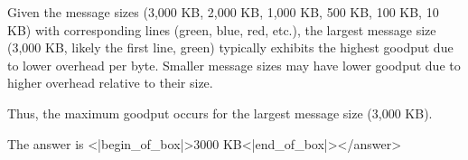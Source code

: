 Given the message sizes (3,000 KB, 2,000 KB, 1,000 KB, 500 KB, 100 KB, 10 KB) with corresponding lines (green, blue, red, etc.), the largest message size (3,000 KB, likely the first line, green) typically exhibits the highest goodput due to lower overhead per byte. Smaller message sizes may have lower goodput due to higher overhead relative to their size.  

Thus, the maximum goodput occurs for the largest message size (3,000 KB).  

The answer is <|begin_of_box|>3000 KB<|end_of_box|></answer>